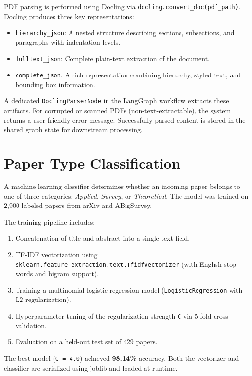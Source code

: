 \documentclass[12pt,a4paper]{report}
\begin{document}
PDF parsing is performed using Docling via \texttt{docling.convert\_doc(pdf\_path)}. Docling produces three key representations:
\begin{itemize}
    \item \texttt{hierarchy\_json}: A nested structure describing sections, subsections, and paragraphs with indentation levels.
    \item \texttt{fulltext\_json}: Complete plain-text extraction of the document.
    \item \texttt{complete\_json}: A rich representation combining hierarchy, styled text, and bounding box information.
\end{itemize}

A dedicated \texttt{DoclingParserNode} in the LangGraph workflow extracts these artifacts. For corrupted or scanned PDFs (non-text-extractable), the system returns a user-friendly error message. Successfully parsed content is stored in the shared graph state for downstream processing.

\section{Paper Type Classification}

A machine learning classifier determines whether an incoming paper belongs to one of three categories: \textit{Applied}, \textit{Survey}, or \textit{Theoretical}. The model was trained on 2,900 labeled papers from arXiv and ABigSurvey.

The training pipeline includes:
\begin{enumerate}
    \item Concatenation of title and abstract into a single text field.
    \item TF-IDF vectorization using \texttt{sklearn.feature\_extraction.text.TfidfVectorizer} (with English stop words and bigram support).
    \item Training a multinomial logistic regression model (\texttt{LogisticRegression} with L2 regularization).
    \item Hyperparameter tuning of the regularization strength \texttt{C} via 5-fold cross-validation.
    \item Evaluation on a held-out test set of 429 papers.
\end{enumerate}

The best model (\texttt{C = 4.0}) achieved \textbf{98.14\%} accuracy. Both the vectorizer and classifier are serialized using joblib and loaded at runtime.
\end{document}
